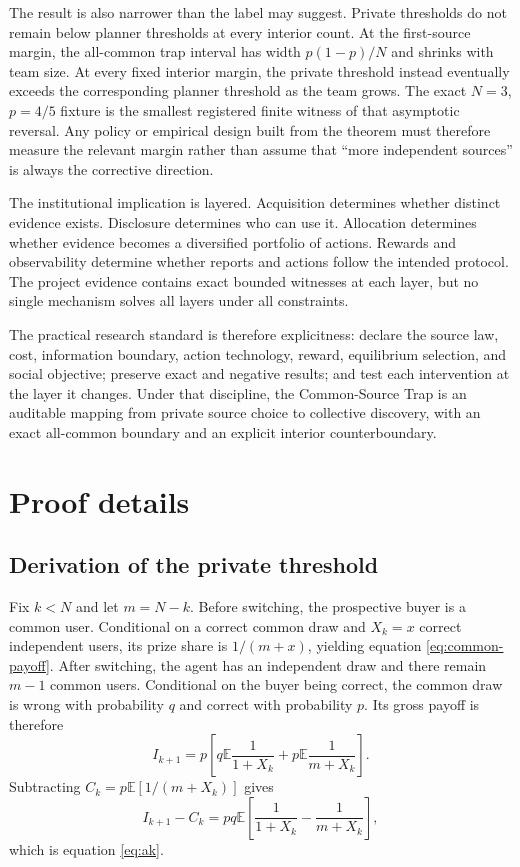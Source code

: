 \documentclass[11pt]{article}
\newcommand{\E}{\mathbb{E}}
\begin{document}
The result is also narrower than the label may suggest. Private thresholds do
not remain below planner thresholds at every interior count. At the first-source
margin, the all-common trap interval has width $p(1-p)/N$ and shrinks with team
size. At every fixed interior margin, the private threshold instead eventually
exceeds the corresponding planner threshold as the team grows. The exact
$N=3$, $p=4/5$ fixture is the smallest registered finite witness of that
asymptotic reversal. Any policy or empirical design built from the theorem must
therefore measure the relevant margin rather than assume that ``more independent
sources'' is always the corrective direction.

The institutional implication is layered. Acquisition determines whether
distinct evidence exists. Disclosure determines who can use it. Allocation
determines whether evidence becomes a diversified portfolio of actions. Rewards
and observability determine whether reports and actions follow the intended
protocol. The project evidence contains exact bounded witnesses at each layer,
but no single mechanism solves all layers under all constraints.

The practical research standard is therefore explicitness: declare the source
law, cost, information boundary, action technology, reward, equilibrium
selection, and social objective; preserve exact and negative results; and test
each intervention at the layer it changes. Under that discipline, the
Common-Source Trap is an auditable mapping from private source choice to collective
discovery, with an exact all-common boundary and an explicit interior
counterboundary.

\appendix
\section{Proof details}

\subsection{Derivation of the private threshold}

Fix $k<N$ and let $m=N-k$. Before switching, the prospective buyer is a common
user. Conditional on a correct common draw and $X_k=x$ correct independent
users, its prize share is $1/(m+x)$, yielding equation
\eqref{eq:common-payoff}. After switching, the agent has an independent draw and
there remain $m-1$ common users. Conditional on the buyer being correct, the
common draw is wrong with probability $q$ and correct with probability $p$.
Its gross payoff is therefore
\[
 I_{k+1}=p\left[q\E\frac{1}{1+X_k}
 +p\E\frac{1}{m+X_k}\right].
\]
Subtracting $C_k=p\E[1/(m+X_k)]$ gives
\[
 I_{k+1}-C_k=pq\E\left[\frac{1}{1+X_k}-\frac{1}{m+X_k}\right],
\]
which is equation \eqref{eq:ak}.
\end{document}
